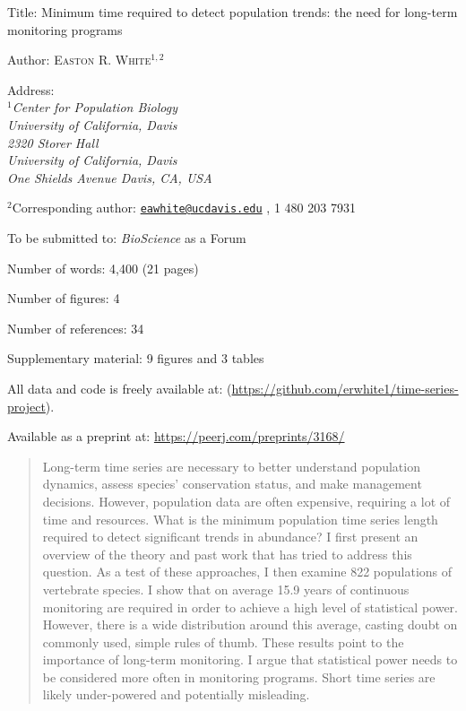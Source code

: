 \documentclass[12pt,]{article}
\title{}
\author{}
\date{}
\begin{document}
Title: Minimum time required to detect population trends: the need for
long-term monitoring programs \vspace{7 mm}

Author: \textsc{Easton R. White$^{1,2}$} \vspace{3 mm}

Address:\emph{
    \\$^1$Center for Population Biology \\
    University of California, Davis \\
    2320 Storer Hall \\
        University of California, Davis \\
        One Shields Avenue Davis, CA, USA} \vspace{3 mm}

\(^2\)Corresponding author:
\href{mailto:eawhite@ucdavis.edu}{\nolinkurl{eawhite@ucdavis.edu}} , 1
480 203 7931 \vspace{1 mm}

To be submitted to: \emph{BioScience} as a Forum \vspace{1 mm}

Number of words: 4,400 (21 pages)\\
\vspace{1 mm}

Number of figures: 4 \vspace{1 mm}

Number of references: 34 \vspace{1 mm}

Supplementary material: 9 figures and 3 tables \vspace{2 mm}

All data and code is freely available at:
(\url{https://github.com/erwhite1/time-series-project}). \vspace{2 mm}

Available as a preprint at: \url{https://peerj.com/preprints/3168/}
\vspace{2 mm}

\pagebreak

\linenumbers

\begin{abstract}
Long-term time series are necessary to better understand population dynamics, assess species' conservation status, and make management decisions. However, population data are often expensive, requiring a lot of time and resources. What is the minimum population time series length required to detect significant trends in abundance? I first present an overview of the theory and past work that has tried to address this question. As a test of these approaches, I then examine 822 populations of vertebrate species. I show that on average 15.9 years of continuous monitoring are required in order to achieve a high level of statistical power. However, there is a wide distribution around this average, casting doubt on commonly used, simple rules of thumb. These results point to the importance of long-term monitoring. I argue that statistical power needs to be considered more often in monitoring programs. Short time series are likely under-powered and potentially misleading.
\end{abstract}
\end{document}
